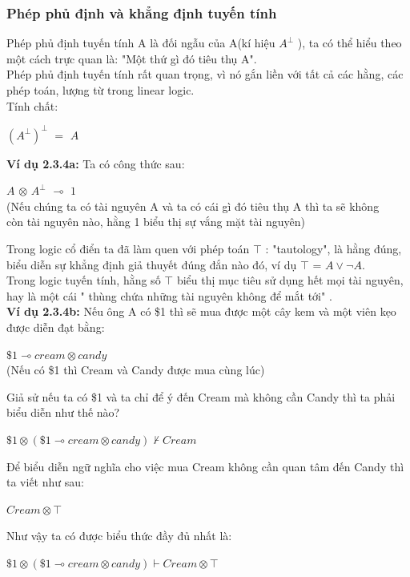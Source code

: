 \documentclass[12pt,a4paper,oneside]{article}
\begin{document}
\subsubsection{Phép phủ định và khẳng định tuyến tính}
Phép phủ định tuyến tính A là đối ngẫu của A(kí hiệu $A ^\bot$ ), ta có thể hiểu theo một cách trực quan là: "Một thứ gì đó tiêu thụ A".\\
Phép phủ định tuyến tính rất quan trọng, vì nó gắn liền với tất cả các hằng, các phép toán, lượng từ trong linear logic.\\
Tính chất:
\begin{center}
	$(A ^\bot)^\bot$ $=$ $A$ 
\end{center}
\textbf{Ví dụ 2.3.4a: } Ta có công thức sau:
\begin{center}
	$A$ $\otimes$  $A ^\bot$ $\multimap$ $1$\\
	(Nếu chúng ta có tài nguyên A và ta có cái gì đó tiêu thụ A thì ta sẽ không \\
	còn tài nguyên nào, hằng 1 biểu thị sự vắng mặt tài nguyên)
\end{center}
Trong logic cổ điển ta đã làm quen với phép toán $\top$ : "tautology", là hằng đúng, biểu diễn sự khẳng định giả thuyết đúng đắn nào đó, ví dụ $\top$ = $A \vee \neg A$.\\
Trong logic tuyến tính, hằng số $\top$ biểu thị mục tiêu sử dụng hết mọi tài nguyên, hay là một cái " thùng chứa những tài nguyên không để mắt tới" .\\
\textbf{Ví dụ 2.3.4b: } Nếu ông A có \$1 thì sẽ mua được một cây kem và một viên kẹo được diễn đạt bằng:\\
\begin{center}
	$\$1 \multimap cream \otimes candy$\\
	(Nếu có \$1 thì Cream và Candy được mua cùng lúc)\\
\end{center}
Giả sử nếu ta có \$1 và ta chỉ để ý đến Cream mà không cần Candy thì ta phải biểu diễn như thế nào?
\begin{center}
	$\$1 \otimes (\$1 \multimap cream \otimes candy) \nvdash Cream$ 
\end{center}

Để biểu diễn ngữ nghĩa cho việc mua Cream không cần quan tâm đến Candy thì ta viết như sau:
\begin{center}
	$Cream \otimes \top$
\end{center}

Như vậy ta có được biểu thức đầy đủ nhất là:
\begin{center}
	$\$1 \otimes (\$1 \multimap cream \otimes candy) \vdash Cream \otimes \top$ 
\end{center}
\end{document}
